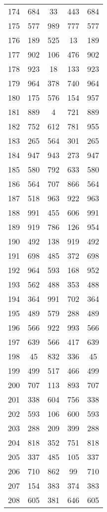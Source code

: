 \documentclass[a4paper,10pt,ngerman]{scrartcl}
\begin{document}
\begin{longtable}[c]{c|c|c|c|c}
    174 & 684 & 33 & 443 & 684 \\
    175 & 577 & 989 & 777 & 577 \\
    176 & 189 & 525 & 13 & 189 \\
    177 & 902 & 106 & 476 & 902 \\
    178 & 923 & 18 & 133 & 923 \\
    179 & 964 & 378 & 740 & 964 \\
    180 & 175 & 576 & 154 & 957 \\
    181 & 889 & 4 & 721 & 889 \\
    182 & 752 & 612 & 781 & 955 \\
    183 & 265 & 564 & 301 & 265 \\
    184 & 947 & 943 & 273 & 947 \\
    185 & 580 & 792 & 633 & 580 \\
    186 & 564 & 707 & 866 & 564 \\
    187 & 518 & 963 & 922 & 963 \\
    188 & 991 & 455 & 606 & 991 \\
    189 & 919 & 786 & 126 & 954 \\
    190 & 492 & 138 & 919 & 492 \\
    191 & 698 & 485 & 372 & 698 \\
    192 & 964 & 593 & 168 & 952 \\
    193 & 562 & 488 & 353 & 488 \\
    194 & 364 & 991 & 702 & 364 \\
    195 & 489 & 579 & 288 & 489 \\
    196 & 566 & 922 & 993 & 566 \\
    197 & 639 & 566 & 417 & 639 \\
    198 & 45 & 832 & 336 & 45 \\
    199 & 499 & 517 & 466 & 499 \\
    200 & 707 & 113 & 893 & 707 \\
    201 & 338 & 604 & 756 & 338 \\
    202 & 593 & 106 & 600 & 593 \\
    203 & 288 & 209 & 399 & 288 \\
    204 & 818 & 352 & 751 & 818 \\
    205 & 337 & 485 & 105 & 337 \\
    206 & 710 & 862 & 99 & 710 \\
    207 & 154 & 383 & 374 & 383 \\
    208 & 605 & 381 & 646 & 605 \\

\end{longtable}
\end{document}
